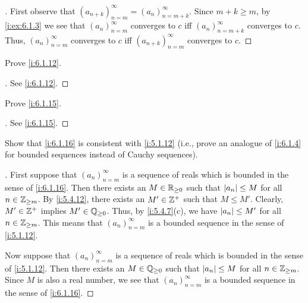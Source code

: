 \begin{proof}[]
  First observe that \((a_{n + k})_{n = m}^\infty = (a_n)_{n = m + k}^\infty\).
  Since \(m + k \geq m\), by \cref{i:ex:6.1.3} we see that \((a_n)_{n = m}^\infty\) converges to \(c\) iff \((a_n)_{n = m + k}^\infty\) converges to \(c\).
  Thus, \((a_n)_{n = m}^\infty\) converges to \(c\) iff \((a_{n + k})_{n = m}^\infty\) converges to \(c\).
\end{proof}

\begin{ex}\label{i:ex:6.1.5}
  Prove \cref{i:6.1.12}.
\end{ex}

\begin{proof}[]
  See \cref{i:6.1.12}.
\end{proof}

\begin{ex}\label{i:ex:6.1.6}
  Prove \cref{i:6.1.15}.
\end{ex}

\begin{proof}[]
  See \cref{i:6.1.15}.
\end{proof}

\begin{ex}\label{i:ex:6.1.7}
  Show that \cref{i:6.1.16} is consistent with \cref{i:5.1.12}
  (i.e., prove an analogue of \cref{i:6.1.4} for bounded sequences instead of Cauchy sequences).
\end{ex}

\begin{proof}[]
  First suppose that \((a_n)_{n = m}^\infty\) is a sequence of reals which is bounded in the sense of \cref{i:6.1.16}.
  Then there exists an \(M \in \mathbb{R}_{\geq 0}\) such that \(\left\lvert a_n\right\rvert \leq M\) for all \(n \in \mathbb{Z}_{\geq m}\).
  By \cref{i:5.4.12}, there exists an \(M' \in \mathbb{Z}^+\) such that \(M \leq M'\).
  Clearly, \(M' \in \mathbb{Z}^+\) implies \(M' \in \mathbb{Q}_{\geq 0}\).
  Thus, by \cref{i:5.4.7}(c), we have \(\left\lvert a_n\right\rvert \leq M'\) for all \(n \in \mathbb{Z}_{\geq m}\).
  This means that \((a_n)_{n = m}^\infty\) is a bounded sequence in the sense of \cref{i:5.1.12}.

  Now suppose that \((a_n)_{n = m}^\infty\) is a sequence of reals which is bounded in the sense of \cref{i:5.1.12}.
  Then there exists an \(M \in \mathbb{Q}_{\geq 0}\) such that \(\left\lvert a_n\right\rvert \leq M\) for all \(n \in \mathbb{Z}_{\geq m}\).
  Since \(M\) is also a real number, we see that \((a_n)_{n = m}^\infty\) is a bounded sequence in the sense of \cref{i:6.1.16}.
\end{proof}

